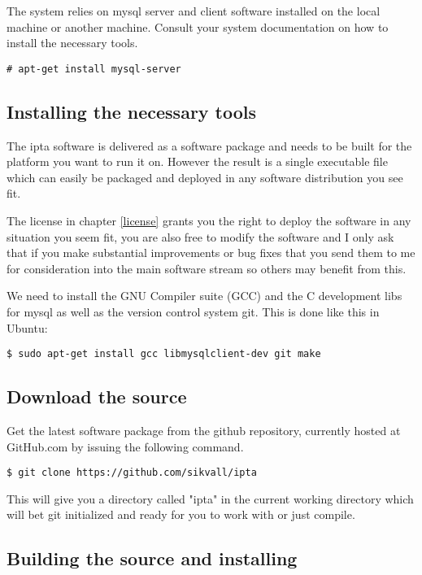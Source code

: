 \documentclass[english,twoside,openright,a4paper,12pt]{article}
\begin{document}
The system relies on mysql server and client software installed on the local machine or another machine. Consult your system documentation on how to install the necessary tools.

\begin{verbatim}
# apt-get install mysql-server
\end{verbatim}

\subsection{Installing the necessary tools}

The ipta software is delivered as a software package and needs to be built for the platform you want to run it on. However the result is a single executable file which can easily be packaged and deployed in any software distribution you see fit.

The license in chapter \ref{license} grants you the right to deploy the software in any situation you seem fit, you are also free to modify the software and I only ask that if you make substantial improvements or bug fixes that you send them to me for consideration into the main software stream so others may benefit from this.

We need to install the GNU Compiler suite (GCC) and the C development libs for mysql as well as the version control system git. This is done like this in Ubuntu:

\begin{verbatim}
$ sudo apt-get install gcc libmysqlclient-dev git make
\end{verbatim}

\subsection{Download the source}

Get the latest software package from the github repository, currently hosted at GitHub.com by issuing the following command.

\small
\begin{verbatim}
$ git clone https://github.com/sikvall/ipta
\end{verbatim}
\normalsize

This will give you a directory called "ipta" in the current working directory which will bet git initialized and ready for you to work with or just compile.

\subsection{Building the source and installing}
\end{document}
